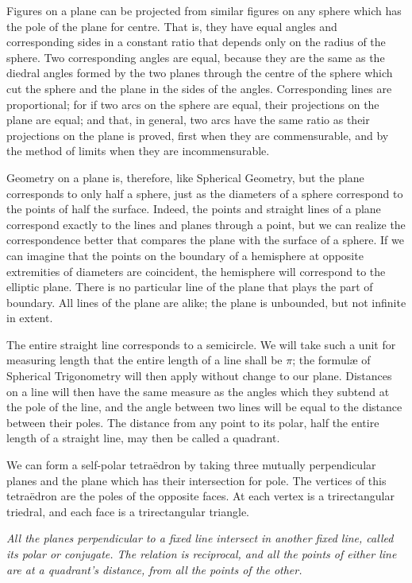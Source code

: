 \begin{description}
Figures on a plane can be projected from similar figures on any
sphere which has the pole of the plane for centre. That is, they
have equal angles and corresponding sides in a constant ratio that
depends only on the radius of the sphere. Two corresponding angles
are equal, because they are the same as the diedral angles formed by
the two planes through the centre of the sphere which cut the sphere
and the plane in the sides of the angles. Corresponding lines are
proportional; for if two arcs on the sphere are equal, their
projections on the plane are equal; and that, in general, two arcs
have the same ratio as their projections on the plane is proved,
first when they are commensurable, and by the method of limits when
they are incommensurable.

Geometry on a plane is, therefore, like Spherical Geometry, but the
plane corresponds to only half a sphere, just as the diameters of a
sphere correspond to the points of half the surface. Indeed, the
points and straight lines of a plane correspond exactly to the lines
and planes through a point, but we can realize the correspondence
better that compares the plane with the surface of a sphere. If we
can imagine that the points on the boundary of a hemisphere at
opposite extremities of diameters are coincident, the hemisphere
will correspond to the elliptic plane. There is no particular line
of the plane that plays the part of boundary. All lines of the plane
are alike; the plane is unbounded, but not infinite in extent.

The entire straight line corresponds to a semicircle. We will take
such a unit for measuring length that the entire length of a line
shall be $\pi$; the formulæ of Spherical Trigonometry will then
apply without change to our plane. Distances on a line will then
have the same measure as the angles which they subtend at the pole
of the line, and the angle between two lines will be equal to the
distance between their poles. The distance from any point to its
polar, half the entire length of a straight line, may then be called
a quadrant.

We can form a self-polar tetraëdron by taking three mutually
perpendicular planes and the plane which has their intersection for
pole. The vertices of this tetraëdron are the poles of the opposite
faces. At each vertex is a trirectangular triedral, and each face is
a trirectangular triangle.

\item[3.~Theorem.] \emph{All the planes perpendicular to a fixed line
intersect in another fixed line, called its polar or conjugate. The
relation is reciprocal, and all the points of either line are at a
quadrant's distance, from all the points of the other.}


\end{description}
